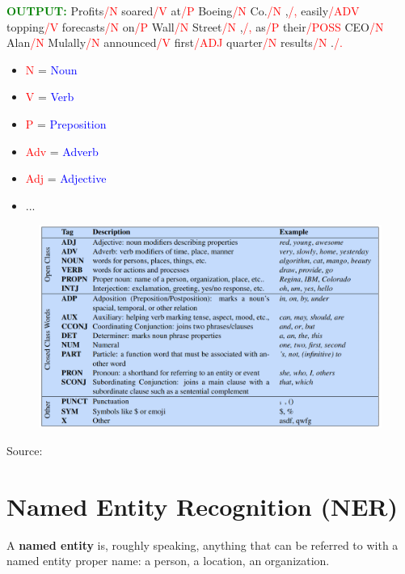   \textcolor{green}{\textbf{OUTPUT:}}
  Profits\textcolor{red}{/N} soared\textcolor{red}{/V} at\textcolor{red}{/P} Boeing\textcolor{red}{/N} Co.\textcolor{red}{/N} ,\textcolor{red}{/,} easily\textcolor{red}{/ADV} topping\textcolor{red}{/V} forecasts\textcolor{red}{/N} on\textcolor{red}{/P} Wall\textcolor{red}{/N} Street\textcolor{red}{/N} ,\textcolor{red}{/,} as\textcolor{red}{/P} their\textcolor{red}{/POSS} CEO\textcolor{red}{/N} Alan\textcolor{red}{/N} Mulally\textcolor{red}{/N} announced\textcolor{red}{/V} first\textcolor{red}{/ADJ} quarter\textcolor{red}{/N} results\textcolor{red}{/N} .\textcolor{red}{/.}
   \vspace{0.5cm}
  \begin{itemize}
    \item \textcolor{red}{N} = \textcolor{blue}{Noun}
    \item \textcolor{red}{V} = \textcolor{blue}{Verb}
    \item \textcolor{red}{P} = \textcolor{blue}{Preposition}
    \item \textcolor{red}{Adv} = \textcolor{blue}{Adverb}
    \item \textcolor{red}{Adj} = \textcolor{blue}{Adjective}
    \item ...
  \end{itemize}


  \begin{figure}[h]
        	\includegraphics[scale = 0.34]{pics/posTags.png}
        \end{figure}
Source: \cite{JurafskyBook}


\section{Named Entity Recognition (NER)}
A \textbf{named entity} is, roughly speaking, anything that can be referred to with a named entity proper name: a person, a location, an organization.\vspace{0.5cm}

